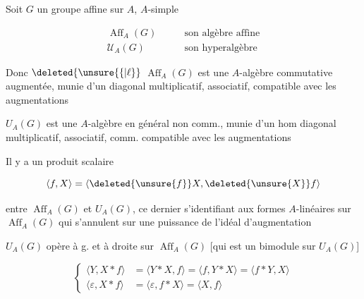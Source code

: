 Soit $G$ un  groupe affine sur $A$, $A$-simple

\[
\begin{aligned}
\operatorname{Aff}_A(G)&\qquad\text{son algèbre affine}\\
\mathcal U_A(G)&\qquad\text{son hyperalgèbre}
\end{aligned}
\]

Donc $\deleted{\unsure{\{|\ell}}$ $\operatorname{Aff}_A(G)$ est une $A$-algèbre commutative augmentée, munie d'un  diagonal multiplicatif, associatif, compatible avec les augmentations

$U_A(G)$ est une $A$-algèbre en général non comm., munie d'un hom diagonal multiplicatif, associatif, comm. compatible avec les augmentations

Il y a un produit scalaire

\[
\langle f,X\rangle=\langle\deleted{\unsure{f}}X,\deleted{\unsure{X}}f\rangle
\]

entre $\operatorname{Aff}_A(G)$ et $U_A(G)$, ce dernier s'identifiant aux formes $A$-linéaires sur $\operatorname{Aff}_A(G)$ qui s'annulent sur une puissance de l'idéal d'augmentation

$U_A(G)$ opère à g. et à droite sur $\operatorname{Aff}_A(G)$ [qui est un bimodule sur $U_A(G)$]

\[
\left\{\begin{aligned}
\langle Y,X*f\rangle&=\langle Y*X,f\rangle=\langle f,Y*X\rangle=\langle f*Y,X\rangle\\
\langle\varepsilon,X*f\rangle&=\langle\varepsilon,f*X\rangle=\langle X,f\rangle
\end{aligned}\right.
\]

